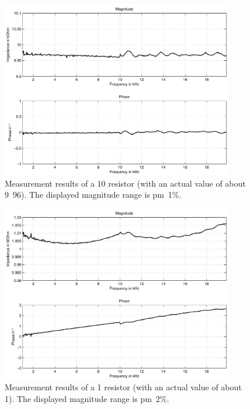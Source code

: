 \begin{figure}[htpb]
  \centering
    \includegraphics[width=0.9\textwidth]{bilder/meas_10k.pdf}
  \caption{Measurement results of a \unit{10}{\kilo\ohm} resistor (with an actual value of about \unit{9.96}{\kilo\ohm}).
    The displayed magnitude range is \unit{\pm 1}{\%}.}
  \label{fig:meas_10k}
\end{figure}

\begin{figure}[htpb]
  \centering
    \includegraphics[width=0.9\textwidth]{bilder/meas_1M.pdf}
  \caption{Measurement results of a \unit{1}{\mega\ohm} resistor (with an actual value of about \unit{1}{\mega\ohm}).
    The displayed magnitude range is \unit{\pm 2}{\%}.}
  \label{fig:meas_1M}
\end{figure}

